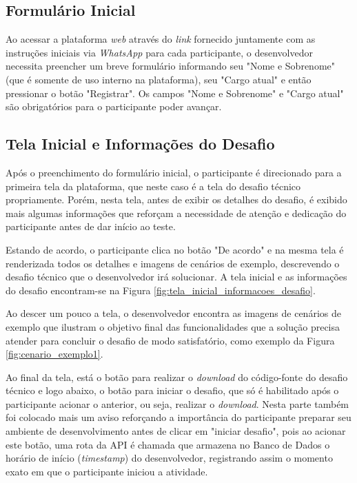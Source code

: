 \documentclass[english,brazilian]{UNISINOSartigo} %
\begin{document}
\subsection{Formulário Inicial}

Ao acessar a plataforma \textit{web} através do \textit{link} fornecido juntamente com as instruções iniciais via \textit{WhatsApp} para cada participante, o desenvolvedor necessita preencher um breve formulário informando seu "Nome e Sobrenome" (que é somente de uso interno na plataforma), seu "Cargo atual" e então pressionar o botão "Registrar". Os campos "Nome e Sobrenome" e "Cargo atual" são obrigatórios para o participante poder avançar.

\subsection{Tela Inicial e Informações do Desafio}

Após o preenchimento do formulário inicial, o participante é direcionado para a primeira tela da plataforma, que neste caso é a tela do desafio técnico propriamente. Porém, nesta tela, antes de exibir os detalhes do desafio, é exibido mais algumas informações que reforçam a necessidade de atenção e dedicação do participante antes de dar início ao teste. 

Estando de acordo, o participante clica no botão "De acordo" e na mesma tela é renderizada todos os detalhes e imagens de cenários de exemplo, descrevendo o desafio técnico que o desenvolvedor irá solucionar. A tela inicial e as informações do desafio encontram-se na Figura \ref{fig:tela_inicial_informacoes_desafio}.

Ao descer um pouco a tela, o desenvolvedor encontra as imagens de cenários de exemplo que ilustram o objetivo final das funcionalidades que a solução precisa atender para concluir o desafio de modo satisfatório, como exemplo da Figura \ref{fig:cenario_exemplo1}.

Ao final da tela, está o botão para realizar o \textit{download} do código-fonte do desafio técnico e logo abaixo, o botão para iniciar o desafio, que só é habilitado após o participante acionar o anterior, ou seja, realizar o \textit{download}. Nesta parte também foi colocado mais um aviso reforçando a importância do participante preparar seu ambiente de desenvolvimento antes de clicar em "iniciar desafio", pois ao acionar este botão, uma rota da API é chamada que armazena no Banco de Dados o horário de início (\textit{timestamp}) do desenvolvedor, registrando assim o momento exato em que o participante iniciou a atividade.
\end{document}
